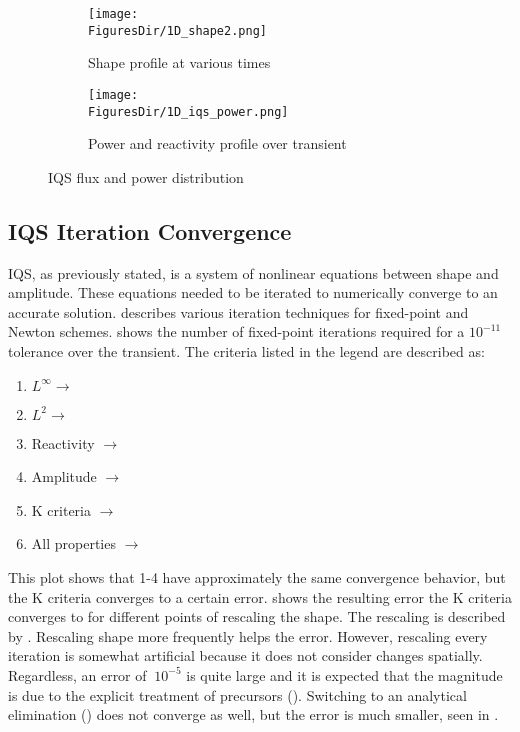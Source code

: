 \begin{figure}[!htbp]
\centering
\begin{subfigure}[b]{0.49\textwidth}
\centering
\texttt{[image: \\FiguresDir/1D\_shape2.png]}
\caption{Shape profile at various times}
\label{fig:1D_shape}
\end{subfigure}
\begin{subfigure}[b]{0.49\textwidth}
\centering
\texttt{[image: \\FiguresDir/1D\_iqs\_power.png]}
\caption{Power and reactivity profile over transient}
\end{subfigure}
\caption{IQS flux and power distribution}
\label{fig:1D_res}
\end{figure}

\subsection{IQS Iteration Convergence}

IQS, as previously stated, is a system of nonlinear equations between shape and amplitude. These equations needed to be iterated to numerically converge to an accurate solution.   describes various iteration techniques for fixed-point and Newton schemes.  shows the number of fixed-point iterations required for a $10^{-11}$ tolerance over the transient. The criteria listed in the legend are described as:
\begin{enumerate}
\item $L^{\infty} \rightarrow$ 
\item $L^{2} \rightarrow$ 
\item Reactivity $\rightarrow$ 
\item Amplitude $\rightarrow$ 
\item K criteria $\rightarrow$ 
\item All properties $\rightarrow$ 
\end{enumerate}
This plot shows that 1-4 have approximately the same convergence behavior, but the K criteria converges to a certain error.  shows the resulting error the K criteria converges to for different points of rescaling the shape. The rescaling is described by . Rescaling shape more frequently helps the error.  However, rescaling every iteration is somewhat artificial because it does not consider changes spatially. Regardless, an error of $~10^{-5}$ is quite large and it is expected that the magnitude is due to the explicit treatment of precursors (). Switching to an analytical elimination () does not converge as well, but the error is much smaller, seen in .

